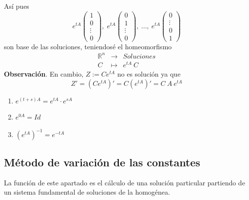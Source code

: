 Así pues
$$e^{tA} \begin{pmatrix}
1  \\
0 \\ \vdots \\ 0 
\end{pmatrix}, \; e^{tA} \begin{pmatrix}
0  \\
1 \\ \vdots \\ 0 
\end{pmatrix}, \: \ldots , \:e^{tA} \begin{pmatrix}
0  \\
\vdots \\ 
0 \\
1 
\end{pmatrix}$$
son base de las soluciones, teniendosé el homeomorfismo
$$\begin{array}{rcl}
     \mathbb R^n & \longrightarrow & Soluciones  \\
     C & \longmapsto & e^{tA} \: C 
\end{array}$$
\textbf{Observación}. En cambio, $Z:=C e^{tA}$ no es solución ya que 
$$Z'=(C e^{tA})'=C (e^{tA})'=C \:  A \: e^{tA}$$
\begin{propi} \: 
\begin{enumerate}
    \item $e^{(t+s)A}=e^{tA} \cdot e^{sA}$
    \item $e^{0 A}=Id$
    \item $(e^{tA})^{-1}=e^{-tA}$
\end{enumerate}
\end{propi}

\subsection{Método de variación de las constantes}
La función de este apartado es el cálculo de una solución particular partiendo de un sistema fundamental de soluciones de la homogénea.

